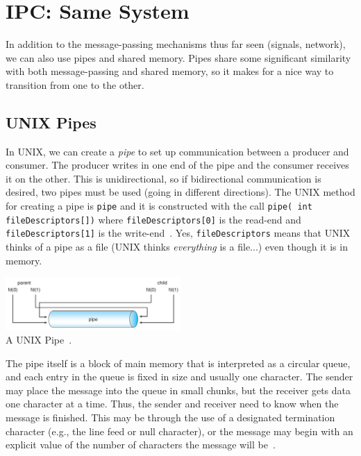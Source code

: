 




\section*{IPC: Same System}

In addition to the message-passing mechanisms thus far seen (signals, network), we can also use pipes and shared memory. Pipes share some significant similarity with both message-passing and shared memory, so it makes for a nice way to transition from one to the other.

\subsection*{UNIX Pipes}

In UNIX, we can create a \textit{pipe} to set up communication between a producer and consumer. The producer writes in one end of the pipe and the consumer receives it on the other. This is unidirectional, so if bidirectional communication is desired, two pipes must be used (going in different directions). The UNIX method for creating a pipe is \texttt{pipe} and it is constructed with the call \texttt{pipe( int fileDescriptors[])} where \texttt{fileDescriptors[0]} is the read-end and \texttt{fileDescriptors[1]} is the write-end~\cite{osc}. Yes, \texttt{fileDescriptors} means that UNIX thinks of a pipe as a file (UNIX thinks \textit{everything} is a file...) even though it is in memory.

\begin{center}
	\includegraphics[width=0.5\textwidth]{images/unix-pipe.png}\\
	A UNIX Pipe~\cite{osc}.
\end{center}

The pipe itself is a block of main memory that is interpreted as a circular queue, and each entry in the queue is fixed in size and usually one character. The sender may place the message into the queue in small chunks, but the receiver gets data one character at a time. Thus, the sender and receiver need to know when the message is finished. This may be through the use of a designated termination character (e.g., the line feed or null character), or the message may begin with an explicit value of the number of characters the message will be~\cite{mte241}.

